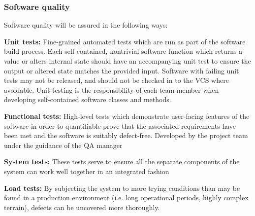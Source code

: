 \documentclass[12pt]{article}
\begin{document}
\subsubsection{Software quality}
Software quality will be assured in the following ways:
\begin{description}
\item{\textbf{Unit tests:}} Fine-grained automated tests which are run as part of the software build process. Each self-contained, nontrivial software function which returns a value or alters internal state should have an accompanying unit test to ensure the output or altered state matches the provided input. Software with failing unit tests may not be released, and should not be checked in to the VCS where avoidable. Unit testing is the responsibility of each team member when developing self-contained software classes and methods.
\item{\textbf{Functional tests:}} High-level tests which demonstrate user-facing features of the software in order to quantifiable prove that the associated requirements have been met and the software is suitably defect-free. Developed by the project team under the guidance of the QA manager

\item{\textbf{System tests:}} These tests serve to ensure all the separate components of the system can work well together in an integrated fashion
\item{\textbf{Load tests:}} By subjecting the system to more trying conditions than may be found in a production environment (i.e. long operational periods, highly complex terrain), defects can be uncovered more thoroughly.

\end{description}
\end{document}
